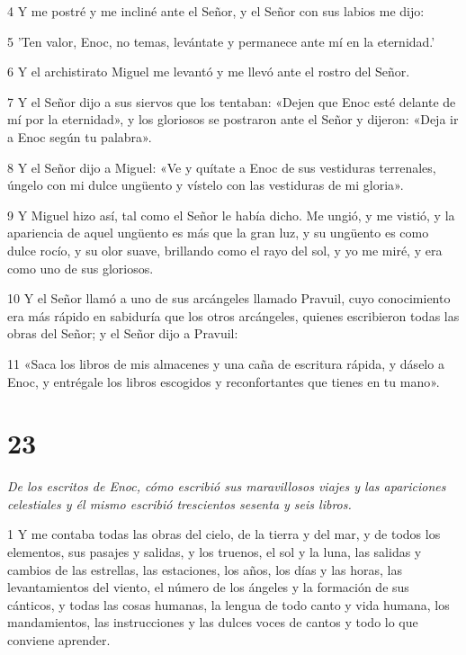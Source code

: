 \par 4 Y me postré y me incliné ante el Señor, y el Señor con sus labios me dijo:

\par 5 'Ten valor, Enoc, no temas, levántate y permanece ante mí en la eternidad.'

\par 6 Y el archistirato Miguel me levantó y me llevó ante el rostro del Señor.

\par 7 Y el Señor dijo a sus siervos que los tentaban: «Dejen que Enoc esté delante de mí por la eternidad», y los gloriosos se postraron ante el Señor y dijeron: «Deja ir a Enoc según tu palabra».

\par 8 Y el Señor dijo a Miguel: «Ve y quítate a Enoc de sus vestiduras terrenales, úngelo con mi dulce ungüento y vístelo con las vestiduras de mi gloria».

\par 9 Y Miguel hizo así, tal como el Señor le había dicho. Me ungió, y me vistió, y la apariencia de aquel ungüento es más que la gran luz, y su ungüento es como dulce rocío, y su olor suave, brillando como el rayo del sol, y yo me miré, y era como uno de sus gloriosos.

\par 10 Y el Señor llamó a uno de sus arcángeles llamado Pravuil, cuyo conocimiento era más rápido en sabiduría que los otros arcángeles, quienes escribieron todas las obras del Señor; y el Señor dijo a Pravuil:

\par 11 «Saca los libros de mis almacenes y una caña de escritura rápida, y dáselo a Enoc, y entrégale los libros escogidos y reconfortantes que tienes en tu mano».



\chapter{23}

\par \textit{De los escritos de Enoc, cómo escribió sus maravillosos viajes y las apariciones celestiales y él mismo escribió trescientos sesenta y seis libros.}

\par 1 Y me contaba todas las obras del cielo, de la tierra y del mar, y de todos los elementos, sus pasajes y salidas, y los truenos, el sol y la luna, las salidas y cambios de las estrellas, las estaciones, los años, los días y las horas, las levantamientos del viento, el número de los ángeles y la formación de sus cánticos, y todas las cosas humanas, la lengua de todo canto y vida humana, los mandamientos, las instrucciones y las dulces voces de cantos y todo lo que conviene aprender.

